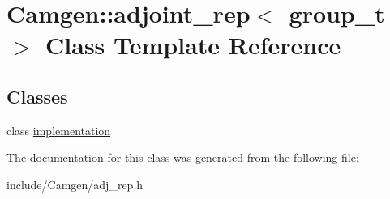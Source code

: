 \hypertarget{a00006}{}\section{Camgen\+:\+:adjoint\+\_\+rep$<$ group\+\_\+t $>$ Class Template Reference}
\label{a00006}
\subsection*{Classes}
\begin{DoxyCompactItemize}
\item 
class \hyperlink{a00285}{implementation}
\end{DoxyCompactItemize}


The documentation for this class was generated from the following file\+:\begin{DoxyCompactItemize}
\item 
include/\+Camgen/adj\+\_\+rep.\+h\end{DoxyCompactItemize}
